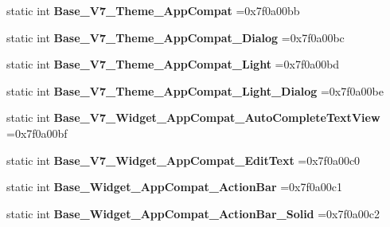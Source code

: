 \begin{DoxyCompactItemize}
static int {\bfseries Base\+\_\+\+V7\+\_\+\+Theme\+\_\+\+App\+Compat} =0x7f0a00bb
\item 
\mbox{\label{classandroid_1_1support_1_1v7_1_1cardview_1_1R_1_1style_af13e463420dba34ce5895137b6b7158c}} 
static int {\bfseries Base\+\_\+\+V7\+\_\+\+Theme\+\_\+\+App\+Compat\+\_\+\+Dialog} =0x7f0a00bc
\item 
\mbox{\label{classandroid_1_1support_1_1v7_1_1cardview_1_1R_1_1style_a9c8af5b06f6b2e7d3cff883d230f574a}} 
static int {\bfseries Base\+\_\+\+V7\+\_\+\+Theme\+\_\+\+App\+Compat\+\_\+\+Light} =0x7f0a00bd
\item 
\mbox{\label{classandroid_1_1support_1_1v7_1_1cardview_1_1R_1_1style_a30d79bf518f78d18e4c8be1ed6171b2b}} 
static int {\bfseries Base\+\_\+\+V7\+\_\+\+Theme\+\_\+\+App\+Compat\+\_\+\+Light\+\_\+\+Dialog} =0x7f0a00be
\item 
\mbox{\label{classandroid_1_1support_1_1v7_1_1cardview_1_1R_1_1style_a1081e228a3c826b7934a1bdbf6c482d0}} 
static int {\bfseries Base\+\_\+\+V7\+\_\+\+Widget\+\_\+\+App\+Compat\+\_\+\+Auto\+Complete\+Text\+View} =0x7f0a00bf
\item 
\mbox{\label{classandroid_1_1support_1_1v7_1_1cardview_1_1R_1_1style_a8cf4a422c6684c3c98f5d0a1eca09b1e}} 
static int {\bfseries Base\+\_\+\+V7\+\_\+\+Widget\+\_\+\+App\+Compat\+\_\+\+Edit\+Text} =0x7f0a00c0
\item 
\mbox{\label{classandroid_1_1support_1_1v7_1_1cardview_1_1R_1_1style_a89e729d640cf4c7d6d89b85bcc036668}} 
static int {\bfseries Base\+\_\+\+Widget\+\_\+\+App\+Compat\+\_\+\+Action\+Bar} =0x7f0a00c1
\item 
\mbox{\label{classandroid_1_1support_1_1v7_1_1cardview_1_1R_1_1style_a598a1385ec140d54d9ab0137ac473fd1}} 
static int {\bfseries Base\+\_\+\+Widget\+\_\+\+App\+Compat\+\_\+\+Action\+Bar\+\_\+\+Solid} =0x7f0a00c2
\item 

\end{DoxyCompactItemize}
